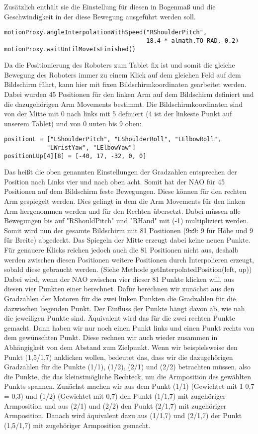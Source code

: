 Zusätzlich enthält sie die Einstellung für diesen in Bogenmaß und die Geschwindigkeit in der diese Bewegung ausgeführt werden soll. 
\begin{verbatim}
motionProxy.angleInterpolationWithSpeed("RShoulderPitch", 
                                        18.4 * almath.TO_RAD, 0.2)
motionProxy.waitUntilMoveIsFinished()
\end{verbatim}
Da die Positionierung des Roboters zum Tablet fix ist und somit die gleiche Bewegung des Roboters immer zu einem Klick auf dem gleichen Feld auf dem Bildschirm führt, kann hier mit fixen Bildschirmkoordinaten gearbeitet werden. 
Dabei wurden 45 Positionen für den linken Arm auf dem Bildschirm definiert und die dazugehörigen Arm Movements bestimmt. Die Bildschirmkoordinaten sind von der Mitte mit 0 nach links mit 5 definiert (4 ist der linkeste Punkt auf unserem Tablet) und von 0 unten bis 9 oben:
\begin{verbatim}
positionL = ["LShoulderPitch", "LShoulderRoll", "LElbowRoll", 
            "LWristYaw", "LElbowYaw"]
positionLUp[4][8] = [-40, 17, -32, 0, 0]
\end{verbatim}
Das heißt die oben genannten Einstellungen der Gradzahlen entsprechen der Position nach Links vier und nach oben acht. Somit hat der NAO für 45 Positionen auf dem Bildschirm feste Bewegungen. Diese können für den rechten Arm gespiegelt werden. Dies gelingt in dem die Arm Movements für den linken Arm hergenommen werden und für den Rechten übersetzt. Dabei müssen alle Bewegungen bis auf "RShouldPitch" und "RHand" mit (-1) multipliziert werden. Somit wird nun der gesamte Bildschirm  mit 81 Positionen (9x9: 9 für Höhe und 9 für Breite) abgedeckt. Das Spiegeln der Mitte erzeugt dabei keine neuen Punkte.
Für genauere Klicks reichen jedoch auch die 81 Positionen nicht aus, deshalb werden zwischen diesen Positionen weitere Positionen durch Interpolieren erzeugt, sobald diese gebraucht werden. (Siehe Methode getInterpolatedPosition(left, up))
Dabei wird, wenn der NAO zwischen vier dieser 81 Punkte klicken will, aus diesen vier Punkten einer berechnet. Dafür berechnen wir zunächst aus den Gradzahlen der Motoren für die zwei linken Punkten die Gradzahlen für die dazwischen liegenden Punkt. Der Einfluss der Punkte hängt davon ab, wie nah die jeweiligen Punkte sind. Äquivalent wird das für die zwei rechten Punkte gemacht. Dann haben wir nur noch einen Punkt links und einen Punkt rechts von dem gewünschten Punkt. Diese rechnen wir auch wieder zusammen in Abhängigkeit von dem Abstand zum Zielpunkt.  
Wenn wir beispielsweise den Punkt (1,5/1,7) anklicken wollen, bedeutet das, dass wir die dazugehörigen Gradzahlen für die Punkte (1/1), (1/2), (2/1) und (2/2) betrachten müssen, also die Punkte, die das kleinstmögliche Rechteck, um die Armposition des gewählten Punkts spannen. Zunächst machen wir aus dem Punkt (1/1) (Gewichtet mit 1-0,7 = 0,3) und (1/2) (Gewichtet mit 0,7) den Punkt (1/1,7) mit zugehöriger Armposition und aus (2/1) und (2/2) den Punkt (2/1,7) mit zugehöriger Armposition. Danach wird äquivalent dazu aus (1/1,7) und (2/1,7) der Punkt (1,5/1,7) mit zugehöriger Armposition gemacht.
